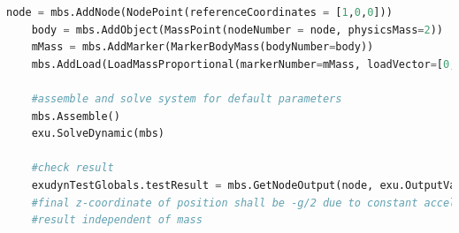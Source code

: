 \pythonstyle
\begin{lstlisting}[language=Python, firstnumber=1]
    node = mbs.AddNode(NodePoint(referenceCoordinates = [1,0,0]))
    body = mbs.AddObject(MassPoint(nodeNumber = node, physicsMass=2))
    mMass = mbs.AddMarker(MarkerBodyMass(bodyNumber=body))
    mbs.AddLoad(LoadMassProportional(markerNumber=mMass, loadVector=[0,0,-9.81]))

    #assemble and solve system for default parameters
    mbs.Assemble()
    exu.SolveDynamic(mbs)

    #check result
    exudynTestGlobals.testResult = mbs.GetNodeOutput(node, exu.OutputVariableType.Position)[2]
    #final z-coordinate of position shall be -g/2 due to constant acceleration with g=-9.81
    #result independent of mass

\end{lstlisting}

